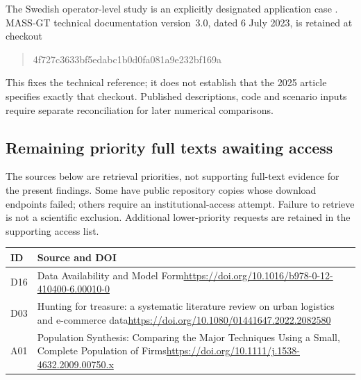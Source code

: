 The Swedish operator-level study is an explicitly designated application case
\parencite{dias2026}. MASS-GT technical documentation version~3.0, dated
6 July 2023, is retained at checkout
\begin{quote}\footnotesize\ttfamily\raggedright
4f727c3633bf5edabc1b0d0fa081a9e232bf169a
\end{quote}
This fixes the technical reference; it does not establish that the 2025 article
specifies exactly that checkout. Published descriptions, code and scenario
inputs require separate reconciliation for later numerical comparisons.

\subsection{Remaining priority full texts awaiting access}
The sources below are retrieval priorities, not supporting full-text evidence
for the present findings. Some have public repository copies whose download
endpoints failed; others require an institutional-access attempt. Failure to
retrieve is not a scientific exclusion. Additional lower-priority requests are
retained in the supporting access list.
\begin{longtable}{@{}p{.10\linewidth}p{.84\linewidth}@{}}
\toprule ID & Source and DOI \\
\midrule\endhead


D16 & Data Availability and Model Form\newline \url{https://doi.org/10.1016/b978-0-12-410400-6.00010-0} \\[.6em]

D03 & Hunting for treasure: a systematic literature review on urban logistics and e-commerce data\newline \url{https://doi.org/10.1080/01441647.2022.2082580} \\[.6em]

A01 & Population Synthesis: Comparing the Major Techniques Using a Small, Complete Population of Firms\newline \url{https://doi.org/10.1111/j.1538-4632.2009.00750.x} \\[.6em]

\bottomrule\end{longtable}

